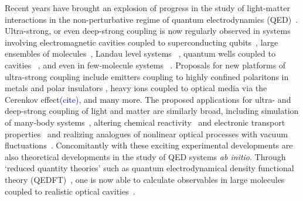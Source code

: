 \documentclass[aps,prl,twocolumn,
	groupedaddress,superscriptaddress,
	amsfonts,amssymb,amsmath,floatfix,
	citeautoscript]{revtex4-1}
\newcommand{\Jadd}[1]{\textcolor{blue}{#1}}
\begin{document}
 Recent years have brought an explosion of progress in the study of light-matter interactions in the non-perturbative regime of quantum electrodynamics (QED)~\cite{flick7strong,ruggenthaler2017b,forn2018ultrastrong}. Ultra-strong, or even deep-strong coupling is now regularly observed in systems involving electromagnetic cavities coupled to superconducting qubits~\cite{blais2004,wallraff2004,yoshihara2017superconducting,forn2017ultrastrong}, large ensembles of molecules~\cite{hutchison2012,hutchison2013,coles2014,coles2014b,shalabney2015coherent, thomas2016,ebbesen2016}, Landau level systems ~\cite{scalari2012ultrastrong,zhang2016collective},  quantum wells coupled to cavities ~\cite{todorov2010ultrastrong,geiser2012ultrastrong}, and even in few-molecule systems ~\cite{benz2016,chikkaraddy2016}. Proposals for new platforms of ultra-strong coupling include emitters coupling to highly confined polaritons in metals and polar insulators \cite{rivera2016shrinking}, heavy ions coupled to optical media via the Cerenkov effect\Jadd{(cite)}, and many more. The proposed applications for ultra- and deep-strong coupling of light and matter are similarly broad, including simulation of many-body systems~\cite{forn2018ultrastrong}, altering chemical reactivity~\cite{hutchison2012, thomas2016,flick2017} and electronic transport properties~\cite{orgiu2015} and realizing analogues of nonlinear optical processes with vacuum fluctuations~\cite{kockum2017deterministic}. Concomitantly with these exciting experimental developments are also theoretical developments in the study of QED systems \textit{ab initio}. Through `reduced quantity theories' such as quantum electrodynamical density functional theory (QEDFT)~\cite{tokatly2013,ruggenthaler2014,flick2015,dimitrov2017,flick2018,flick2018b}, one is now able to calculate observables in large molecules coupled to realistic optical cavities~\cite{pellegrini2015,flick2017c}. 
\end{document}
